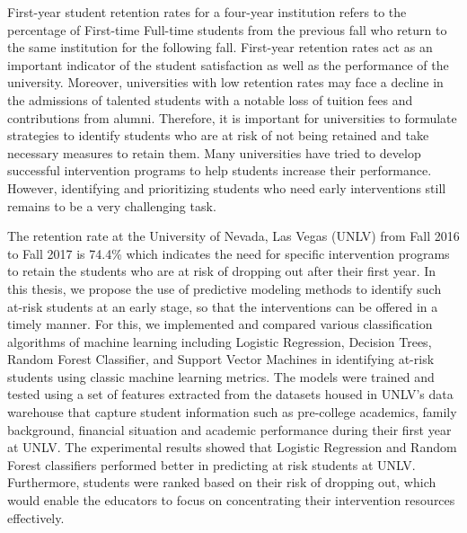 \documentclass[11pt,openright]{report}
\begin{document}
\thesistitlepage
\copyrightpage

\newpage

\electronicapprovalpage


\begin{thesisabstract}
First-year student retention rates for a four-year institution refers to the percentage of First-time Full-time students from the previous fall who return to the same institution for the following fall. First-year retention rates act as an important indicator of the student satisfaction as well as the performance of the university. Moreover, universities with low retention rates may face a decline in the admissions of talented students with a notable loss of tuition fees and contributions from alumni. Therefore, it is important for universities to formulate strategies to identify students who are at risk of not being retained and take necessary measures to retain them. Many universities have tried to develop successful intervention programs to help students increase their performance. However, identifying and prioritizing students who need early interventions still remains to be a very challenging task.    

The retention rate at the University of Nevada, Las Vegas (UNLV) from Fall 2016 to Fall 2017 is 74.4\% which indicates the need for specific intervention programs to retain the students who are at risk of dropping out after their first year. In this thesis, we propose the use of predictive modeling methods to identify such at-risk students at an early stage, so that the interventions can be offered in a timely manner. For this, we implemented and compared various classification algorithms of machine learning including Logistic Regression, Decision Trees, Random Forest Classifier, and Support Vector Machines in identifying at-risk students using classic machine learning metrics. The models were trained and tested using a set of features extracted from the datasets housed in UNLV's data warehouse that capture student information such as pre-college academics, family background, financial situation and academic performance during their first year at UNLV. The experimental results showed that Logistic Regression and Random Forest classifiers performed better in predicting at risk students at UNLV. Furthermore, students were ranked based on their risk of dropping out, which would enable the educators to focus on concentrating their intervention resources effectively.
\end{thesisabstract}
\end{document}
